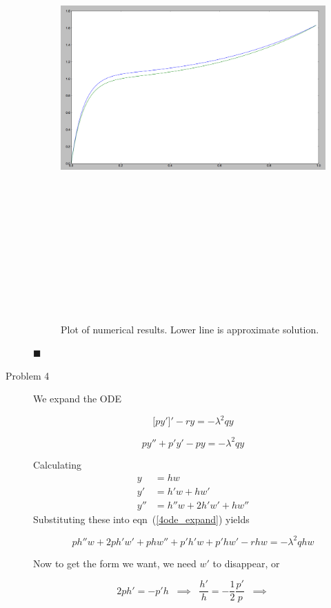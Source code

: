 \documentclass[11pt]{article}
\newcommand{\eq}[1]{\begin{align*}#1\end{align*}}
\newcommand{\eqn}[2]{
  \begin{equation}
    \label{#1}
    #2
  \end{equation}
}
\newcommand{\lam}{\lambda}
\newcommand{\eqr}[1]{eqn~(\ref{#1})}
\begin{document}
\begin{description}
\begin{figure}[H]
\begin{center}
\includegraphics[angle=90,height=7in]{plot.png}
\caption{Plot of numerical results. Lower line is approximate solution.}
\end{center}
\end{figure}
\hfill $\blacksquare$
\item[Problem 4] We expand the ODE
\eqn{4ode}{
  \big[
  py'
  \big]'
  - ry
  =
  -\lam^2qy
}
\eqn{4ode_expand}{
  py'' + p'y' - py = -\lam^2 qy
}
Calculating
\eq{
  y &= hw\\
  y' &= h'w + hw'\\
  y'' &= h''w + 2 h'w' + hw''
}
Substituting these into \eqr{4ode_expand} yields
\eqn{4ode_subs}{
  ph''w + 2ph'w' + phw'' + p'h'w + p'hw' - rhw = -\lam^2qhw
}
Now to get the form we want, we need $w'$ to disappear, or
\eqn{4h_cond}{
  2ph' = -p'h
  \;\;
  \implies
  \;\;
  \frac{h'}{h} = -\frac{1}{2}\frac{p'}{p}
  \;\;
  \implies
}
\end{description}
\end{document}
